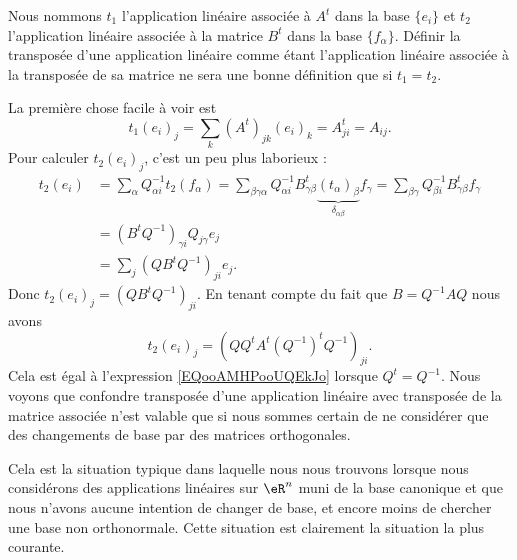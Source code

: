 Nous nommons \( t_1\) l'application linéaire associée à \( A^t\) dans la base \( \{ e_i \}\) et \( t_2\) l'application linéaire associée à la matrice \( B^t\) dans la base \( \{ f_{\alpha} \}\). Définir la transposée d'une application linéaire comme étant l'application linéaire associée à la transposée de sa matrice ne sera une bonne définition que si \( t_1=t_2\).

La première chose facile à voir est
\begin{equation}        \label{EQooAMHPooUQEkJo}
    t_1(e_i)_j=\sum_k(A^t)_{jk}(e_i)_k=A^t_{ji}=A_{ij}.
\end{equation}
Pour calculer \( t_2(e_i)_j\), c'est un peu plus laborieux :
\begin{subequations}
    \begin{align}
        t_2(e_i)&=\sum_{\alpha}Q_{\alpha i}^{-1} t_2(f_\alpha)=\sum_{\beta\gamma\alpha}Q_{\alpha i}^{-1}B^t_{\gamma\beta}\underbrace{(t_{\alpha})_{\beta}}_{\delta_{\alpha\beta}}f_{\gamma}=\sum_{\beta\gamma}Q_{\beta i}^{-1}B^t_{\gamma\beta}f_{\gamma}\\
        &=(B^tQ^{-1})_{\gamma i}Q_{j\gamma}e_j\\
        &=\sum_j(QB^tQ^{-1})_{ji}e_j.
    \end{align}
\end{subequations}
Donc \( t_2(e_i)_j=(QB^tQ^{-1})_{ji}\). En tenant compte du fait que \( B=Q^{-1}AQ\) nous avons
\begin{equation}
    t_2(e_i)_j=(QQ^tA^t(Q^{-1})^tQ^{-1})_{ji}.
\end{equation}
Cela est égal à l'expression \eqref{EQooAMHPooUQEkJo} lorsque \( Q^t=Q^{-1}\). Nous voyons que confondre transposée d'une application linéaire avec transposée de la matrice associée n'est valable que si nous sommes certain de ne considérer que des changements de base par des matrices orthogonales.

Cela est la situation typique dans laquelle nous nous trouvons lorsque nous considérons des applications linéaires sur \( \eR^n\) muni de la base canonique et que nous n'avons aucune intention de changer de base, et encore moins de chercher une base non orthonormale. Cette situation est clairement la situation la plus courante.

